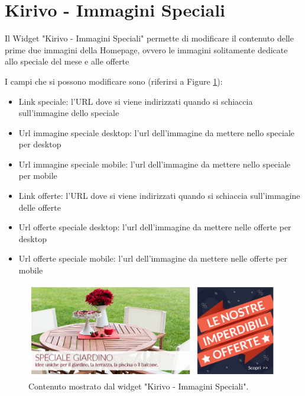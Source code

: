 




\newpage


\section{Kirivo - Immagini Speciali}

Il Widget "Kirivo - Immagini Speciali" permette di modificare il contenuto
delle prime due immagini della Homepage, ovvero le immagini solitamente dedicate
allo speciale del mese e alle offerte 

I campi che si possono modificare sono (riferirsi a Figure \ref{fig:kspec}):
\begin{itemize}
\item Link speciale: l'URL dove si viene indirizzati quando si schiaccia sull'immagine dello speciale
\item Url immagine speciale desktop: l'url dell'immagine da mettere nello speciale per desktop
\item Url immagine speciale mobile: l'url dell'immagine da mettere nello speciale per mobile
\item Link offerte: l'URL dove si viene indirizzati quando si schiaccia sull'immagine delle offerte
\item Url offerte speciale desktop: l'url dell'immagine da mettere nelle offerte per desktop
\item Url offerte speciale mobile: l'url dell'immagine da mettere nelle offerte per mobile
\end{itemize}

\begin{figure}
  \includegraphics[width=\textwidth]{figure/kspec.png}
  \caption{Contenuto mostrato dal widget "Kirivo - Immagini Speciali".}
  \label{fig:kspec}
\end{figure}

